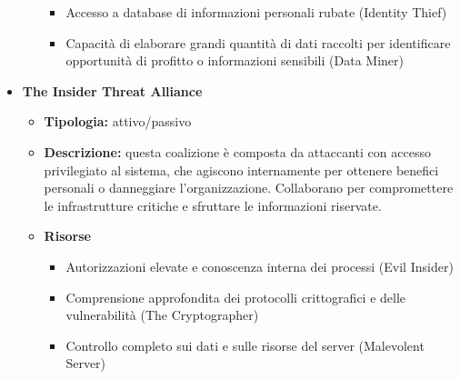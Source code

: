 \begin{itemize}
\begin{itemize}
\begin{itemize}
                            \vspace{3mm}
    
                            \item Accesso a database di informazioni personali rubate (Identity Thief)
    
                            \vspace{3mm}
    
                            \item Capacità di elaborare grandi quantità di dati raccolti per identificare opportunità di profitto o informazioni sensibili (Data Miner)
                        \end{itemize}
                \end{itemize}
    
            \item \textbf{The Insider Threat Alliance}
                \begin{itemize}
                    \item \textbf{Tipologia:} attivo/passivo
    
                    \item \textbf{Descrizione:} questa coalizione è composta da attaccanti con accesso privilegiato al sistema, che agiscono internamente per ottenere benefici personali o danneggiare l'organizzazione.
                    Collaborano per compromettere le infrastrutture critiche e sfruttare le informazioni riservate.
    
                    \item \textbf{Risorse}
                        \begin{itemize}
                            \item Autorizzazioni elevate e conoscenza interna dei processi (Evil Insider)
                            
                            \vspace{3mm}
    
                            \item Comprensione approfondita dei protocolli crittografici e delle vulnerabilità (The Cryptographer)
    
                            \vspace{3mm}
    
                            \item Controllo completo sui dati e sulle risorse del server (Malevolent Server)
                        \end{itemize}
                \end{itemize}
    

\end{itemize}

